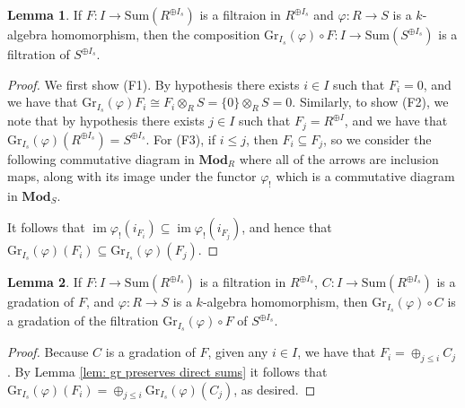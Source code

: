 \documentclass[oneside,11pt]{amsart}
\newcommand{\bMod}{\ensuremath{\textbf{Mod}}}
\newcommand{\Sum}{\ensuremath{\text{Sum}}}
\newcommand{\Gr}{\ensuremath{\text{Gr}}}
\newcommand{\im}{\operatorname{im}}
\theoremstyle{definition}
\newtheorem{proof techniques}{Proof Techniques}
\newtheorem{lemma}{Lemma}
\begin{document}
\begin{lemma}
If $F : I \to \Sum(R^{\oplus I_s})$ is a filtraion in $R^{\oplus I_s}$ and $\varphi : R \to S$ is a $k$-algebra homomorphism, then the composition $\Gr_{I_s}(\varphi) \circ F : I \to \Sum(S^{\oplus I_s})$ is a filtration of $S^{\oplus I_s}$. 
\end{lemma}

\begin{proof}
We first show (F1). By hypothesis there exists $i \in I$ such that $F_i = 0$, and we have that $\Gr_{I_s}(\varphi) F_i \cong F_i \otimes_R S = \{ 0 \} \otimes_R S = 0$. Similarly, to show (F2), we note that by hypothesis there exists $j \in I$ such that $F_j = R^{\oplus I}$, and we have that $\Gr_{I_s}(\varphi) (R^{\oplus I_s}) = S^{\oplus I_s}$. For (F3), if $i \leq j$, then $F_i \subseteq F_j$, so we consider the following commutative diagram in $\bMod_R$ where all of the arrows are inclusion maps, along with its image under the functor $\varphi_!$ which is a commutative diagram in $\bMod_S$.

\begin{center}
\end{center}

It follows that $\im \varphi_!(i_{F_i}) \subseteq \im \varphi_!(i_{F_j})$, and hence that $\Gr_{I_s}(\varphi)( F_i ) \subseteq \Gr_{I_s}(\varphi) (F_j )$.
\end{proof}


\begin{lemma}\label{lem: gr preserves gradations}
If $F : I \to \Sum(R^{\oplus I_s})$ is a filtration in $R^{\oplus I_s}$, $C: I \to \Sum(R^{\oplus I_s})$ is a gradation of $F$, and $\varphi : R \to S$ is a $k$-algebra homomorphism, then $\Gr_{I_s}(\varphi) \circ C$ is a gradation of the filtration $\Gr_{I_s}(\varphi) \circ F$ of $S^{\oplus I_s}$. 
\end{lemma}

\begin{proof}
Because $C$ is a gradation of $F$, given any $i \in I$, we have that $F_i = \oplus_{j \leq i} C_j$. By Lemma \ref{lem: gr preserves direct sums} it follows that $\Gr_{I_s}(\varphi)(F_i) = \oplus_{j \leq i} \Gr_{I_s}(\varphi)(C_j)$, as desired. 
\end{proof}
\end{document}
